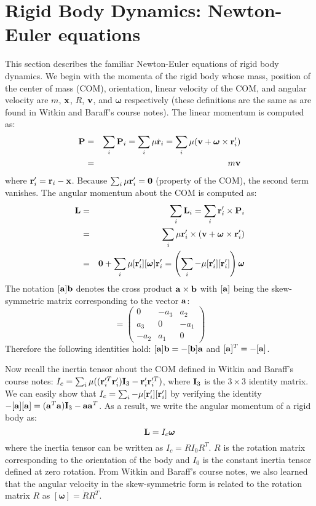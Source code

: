 \section{Rigid Body Dynamics: Newton-Euler equations}
This section describes the familiar Newton-Euler equations of rigid
body dynamics. We begin with the momenta of the rigid body whose mass,
position of the center of mass (COM), orientation, linear velocity of
the COM, and angular velocity are $m$, $\mathbf{x}$, $R$, $\mathbf{v}$, and
$\bm{\omega}$ respectively (these definitions are the same as are found
in Witkin and Baraff's course notes). The linear momentum  is computed as:
\begin{eqnarray}
\mathbf{P} &=& \sum_i \mathbf{P}_i = \sum_i \mathbf{\mu} \dot{\mathbf{r}}_i = \sum_i  \mathbf{\mu} (\mathbf{v} + \bm{\omega}
    \times \mathbf{r}_i') \nonumber \\
 &=& m \mathbf{v}
\end{eqnarray}
where $\mathbf{r}_i' = \mathbf{r}_i - \mathbf{x}$. Because $\sum_i \mathbf{\mu}
\mathbf{r}_i' = \mathbf{0}$ (property of the COM), the second term vanishes. The angular momentum  about the COM is computed as:
\begin{eqnarray}
\nonumber
\mathbf{L} & = & \sum_i \mathbf{L}_i  = \sum_i \mathbf{r}_i' \times \mathbf{P}_i\\
\nonumber
& = & \sum_i \mathbf{\mu} \mathbf{r}_i' \times (\mathbf{v} + \bm{\omega} \times \mathbf{r}_i')\\
&= & \mathbf{0} + \sum_i \mathbf{\mu} [\mathbf{r}_i'][\bm{\omega}]\mathbf{r}_i' = \left ( \sum_i -\mathbf{\mu} [\mathbf{r}_i'][\mathbf{r}_i'] \right )\bm{\omega}
\end{eqnarray}
The notation $[\mathbf{a}] \mathbf{b}$ denotes the cross product $\mathbf{a}\times \mathbf{b}$ with $[\mathbf{a}]$ being the skew-symmetric matrix corresponding to the vector $\mathbf{a}$:
\begin{equation}
[\vc{a}] = 
\begin{pmatrix}
0 & -a_3 & a_2\\
a_3&  0 & -a_1\\
-a_2 & a_1 & 0
\end{pmatrix}
\end{equation}
Therefore the following identities hold: $[\mathbf{a}]\mathbf{b} = -[\mathbf{b}]\mathbf{a}$ and $[\mathbf{a}]^T = -[\mathbf{a}]$.

Now recall the inertia tensor about the COM defined in Witkin and
Baraff's course notes: $I_c = \sum_i \mathbf{\mu} ((\mathbf{r}_i'^T
\mathbf{r}_i')\mathbf{I}_3 - \mathbf{r}_i' \mathbf{r}_i'^T)$, where $\mathbf{I}_3$ is the $3\times 3$
identity matrix. We can easily show that
$I_c = \sum_i -\mathbf{\mu} [\mathbf{r}_i'][\mathbf{r}_i']$ by verifying the
identity $-[\mathbf{a}][\mathbf{a}] = (\mathbf{a}^T\mathbf{a}) \mathbf{I}_3  -
\mathbf{a}\mathbf{a}^T$. As a result, we write the angular momentum of a rigid body as:
\begin{equation}
\mathbf{L} = I_c \bm{\omega}
\end{equation}
where the inertia tensor can be written as $I_c = RI_0R^T$. $R$ is the rotation matrix corresponding to the orientation of the body and $I_0$ is the constant inertia tensor defined at zero rotation. From Witkin and Baraff's course notes, we also learned that the angular velocity in the skew-symmetric form is related to the rotation matrix $R$ as $[\bm{\omega}] = \dot{R}R^T$.

